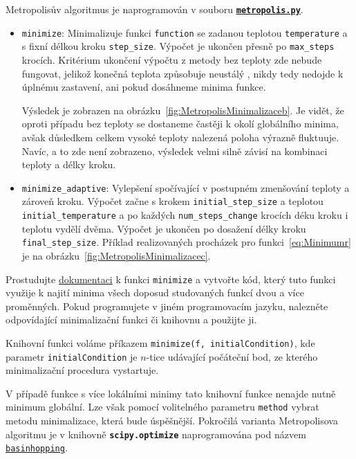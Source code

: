 \documentclass[a4paper,11pt,twoside]{article}
\def\code#1{\textnormal{\texttt{#1}}}
\def\file#1{\textnormal{\textbf{\texttt{#1}}}}
\def\ghfile#1#2{\textnormal{\textbf{\texttt{\href{https://github.com/PavelStransky/PCInPhysics/blob/main/#1#2}{#2}}}}}
\theoremstyle{red}
\theoremstyle{green}
\begin{document}
\begin{solution}
    Metropolisův algoritmus je naprogramován v souboru \ghfile{python/randomwalk/}{metropolis.py}.
    \begin{itemize}
        \item \code{minimize}: 
            Minimalizuje funkci \code{function} se zadanou teplotou \code{temperature} a s fixní délkou kroku \code{step_size}. 
            Výpočet je ukončen přesně po \code{max_steps} krocích.
            Kritérium ukončení výpočtu z metody bez teploty zde nebude fungovat, jelikož konečná teplota způsobuje neustálý , nikdy tedy nedojde k úplnému zastavení, ani pokud dosáhneme minima funkce.

            Výsledek je zobrazen na obrázku~\ref{fig:MetropolisMinimalizaceb}.
            Je vidět, že oproti případu bez teploty se dostaneme častěji k okolí globálního minima, avšak důsledkem celkem vysoké teploty nalezená poloha výrazně fluktuuje.
            Navíc, a to zde není zobrazeno, výsledek velmi silně závisí na kombinaci teploty a délky kroku.
            
        \item \code{minimize_adaptive}:
            Vylepšení spočívající v postupném zmenšování teploty a zároveň kroku.
            Výpočet začne s krokem \code{initial_step_size} a teplotou \code{initial_temperature} a po každých \code{num_steps_change} krocích déku kroku i teplotu vydělí dvěma.
            Výpočet je ukončen po dosažení délky kroku \code{final_step_size}.
            Příklad realizovaných procházek pro funkci~\eqref{eq:Minimumr} je na obrázku~\ref{fig:MetropolisMinimalizacec}.

    \end{itemize}
\end{solution}

\begin{solved}
    Prostudujte \href{https://docs.scipy.org/doc/scipy/reference/generated/scipy.optimize.minimize.html}{dokumentaci} k funkci \code{minimize} a vytvořte kód, který tuto funkci využije k najití minima všech doposud studovaných funkcí dvou a více proměnných.
    Pokud programujete v jiném programovacím jazyku, nalezněte odpovídající minimalizační funkci či knihovnu a použijte ji.
\end{solved}

\begin{solution}
    Knihovní funkci voláme příkazem \code{minimize(f, initialCondition)}, kde parametr \code{initialCondition} je $n$-tice udávající počáteční bod, ze kterého minimalizační procedura vystartuje.

    V případě funkce s více lokálními minimy tato knihovní funkce nenajde nutně minimum globální.
    Lze však pomocí volitelného parametru \code{method} vybrat metodu minimalizace, která bude úspěšnější.
    Pokročilá varianta Metropolisova algoritmu je v knihovně \file{scipy.optimize} naprogramována pod názvem \code{\href{https://docs.scipy.org/doc/scipy/reference/generated/scipy.optimize.basinhopping.html}{basinhopping}}.
\end{solution}
\end{document}
